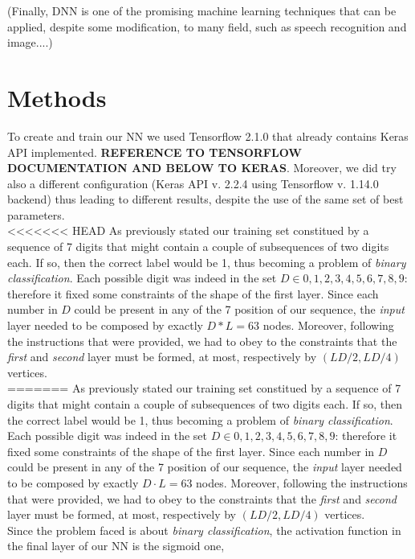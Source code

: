 \documentclass[prl,twocolumn]{revtex4-1}
\begin{document}
(Finally, DNN is one of the promising machine learning techniques that can be applied, despite some modification, to many field, such as speech recognition and image....)





\section{Methods}
To create and train our NN we used Tensorflow 2.1.0 that already contains Keras API implemented. \textbf{REFERENCE TO TENSORFLOW DOCUMENTATION AND BELOW TO KERAS}. Moreover, we did try also a different configuration (Keras API v. 2.2.4 using Tensorflow v. 1.14.0 backend) thus leading to different results, despite the use of the same set of best parameters.\\
<<<<<<< HEAD
As previously stated our training set constitued by a sequence of 7 digits that might contain a couple of subsequences of two digits each. If so, then the correct label would be 1, thus becoming a problem of \textit{binary classification}. Each possible digit was indeed in the set $D \in  {0,1,2,3,4,5,6,7,8,9}$: therefore it fixed some constraints of the shape of the first layer. Since each number in $D$ could be present in any of the 7 position of our sequence, the \textit{input} layer needed to be composed by exactly $D*L=63$ nodes. Moreover, following the instructions that were provided, we had to obey to the constraints that the \textit{first} and \textit{second} layer must be formed, at most,  respectively by $(LD/2, LD/4)$ vertices.\\
=======
As previously stated our training set constitued by a sequence of 7 digits that might contain a couple of subsequences of two digits each. If so, then the correct label would be 1, thus becoming a problem of \textit{binary classification}. Each possible digit was indeed in the set $D \in  {0,1,2,3,4,5,6,7,8,9}$: therefore it fixed some constraints of the shape of the first layer. Since each number in $D$ could be present in any of the 7 position of our sequence, the \textit{input} layer needed to be composed by exactly $D \cdot L=63$ nodes. Moreover, following the instructions that were provided, we had to obey to the constraints that the \textit{first} and \textit{second} layer must be formed, at most,  respectively by $(LD/2, LD/4)$ vertices.\\
Since the problem faced is about \textit{binary classification}, the activation function in the final layer of our NN is the sigmoid one,
\end{document}
